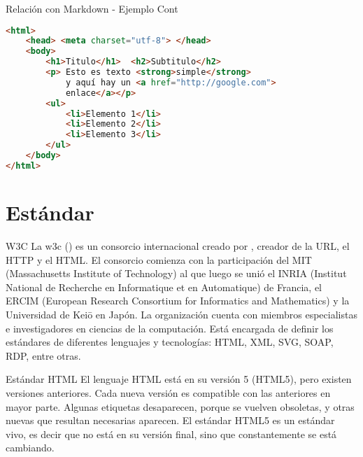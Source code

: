 \begin{frame}[fragile]{Relación con Markdown - Ejemplo Cont}
		\begin{lstlisting}[language=HTML]
<html>
	<head> <meta charset="utf-8"> </head>
	<body>
		<h1>Titulo</h1>  <h2>Subtitulo</h2>
		<p> Esto es texto <strong>simple</strong>
			y aquí hay un <a href="http://google.com">
			enlace</a></p>
		<ul>
			<li>Elemento 1</li>
			<li>Elemento 2</li>
			<li>Elemento 3</li>
		</ul>
	</body>
</html>
		\end{lstlisting}
\end{frame}


\section{Estándar}


\begin{frame}[fragile]{W3C}
	La w3c () es un consorcio internacional
	creado por , creador de la URL, el HTTP y el HTML.
	\jump
	El consorcio comienza con la participación del MIT (Massachusetts Institute of
	Technology) al que luego se unió el INRIA (Institut National de Recherche en
	Informatique et en Automatique) de Francia, el ERCIM (European Research
	Consortium for Informatics and Mathematics) y la Universidad de Keiō en Japón.
	\jump
	La organización cuenta con miembros especialistas e investigadores en ciencias
	de la computación. Está encargada de definir los estándares de diferentes
	lenguajes y tecnologías: HTML, XML, SVG, SOAP, RDP, entre otras.
\end{frame}


\begin{frame}[fragile]{Estándar HTML}
	El lenguaje HTML está en su versión 5 (HTML5), pero existen versiones
	anteriores.
	\jump
	Cada nueva versión es compatible con las anteriores en mayor parte.
	Algunas etiquetas desaparecen, porque se vuelven obsoletas, y otras nuevas
	que resultan necesarias aparecen.
	\jump
	El estándar HTML5 es un estándar vivo, es decir que no está en su versión
	final, sino que constantemente se está cambiando.
\end{frame}


